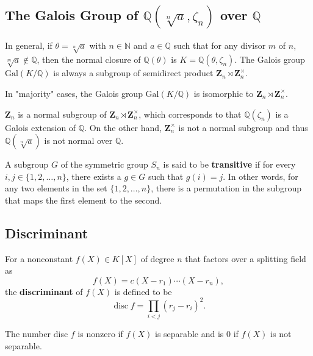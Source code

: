 \subsection{The Galois Group of \texorpdfstring{$\mathbb{Q}(\sqrt[n]{ a },\zeta _n)$}{mathbbQ(sqrt[n] a ,zeta _n)} over \texorpdfstring{$\mathbb{Q}$}{mathbbQ}}

In general, if $\theta=\sqrt[n]{  a}$ with $n\in \mathbb{N}$ and $a\in \mathbb{Q}$ such that for any divisor $m$ of $n$, $\sqrt[m]{ a }\not\in \mathbb{Q}$, then the normal closure of $\mathbb{Q}(\theta)$ is $K=\mathbb{Q}(\theta,\zeta _n)$. The Galois group $\mathrm{Gal}\left( K/\mathbb{Q} \right)$ is always a subgroup of semidirect product $\mathbf{Z}_n\rtimes \mathbf{Z}_n^{\times}$.

In "majority" cases, the Galois group $\mathrm{Gal}\left( K/\mathbb{Q} \right)$ is isomorphic to $\mathbf{Z}_n\rtimes \mathbf{Z}_n^{\times}$.

\begin{note}
$\mathbf{Z}_n$ is a normal subgroup of $\mathbf{Z}_n\rtimes \mathbf{Z}^{\times}_n$, which corresponds to that $\mathbb{Q}(\zeta _n)$ is a Galois extension of $\mathbb{Q}$. On the other hand, $\mathbf{Z}^{\times}_n$ is not a normal subgroup and thus $\mathbb{Q}(\sqrt[n]{ a })$ is not normal over $\mathbb{Q}$.
\end{note}
\begin{definition}[transitive]
A subgroup $G$ of the symmetric group $S_n$ is said to be \textbf{transitive} if for every $i, j \in \{1, 2, \dots, n\}$, there exists a $g \in G$ such that $g(i) = j$. In other words, for any two elements in the set $\{1, 2, \dots, n\}$, there is a permutation in the subgroup that maps the first element to the second.
\end{definition}

\subsection{Discriminant}

\begin{definition}[discriminant]
For a nonconstant $f(X) \in K[X]$ of degree $n$ that factors over a splitting field as
\[
f(X)=c\left(X-r_1\right) \cdots\left(X-r_n\right),
\]the \textbf{discriminant} of $f(X)$ is defined to be
\[
\operatorname{disc} f=\prod_{i<j}\left(r_j-r_i\right)^2 .
\]
\end{definition}
The number disc $f$ is nonzero if $f(X)$ is separable and is 0 if $f(X)$ is not separable.

